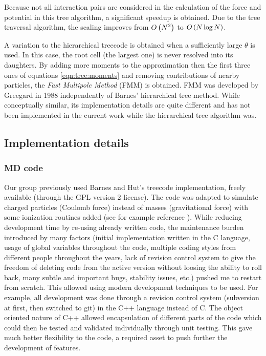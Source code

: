 Because not all interaction pairs are considered in the calculation of the
force and potential in this tree algorithm,
a significant speedup is obtained. Due to the tree
traversal algorithm, the scaling
improves
from $O\left( N^2 \right)$ to $O\left( N \log{N} \right)$\cite{Barnes1986,Gibbon2002,Pfalzner1996}.

A variation to the hierarchical treecode is obtained when a sufficiently large
$\theta$ is used. In this case, the root cell (the largest one) is never
resolved into its daughters. By adding more moments to the approximation then
the first three ones of equations \eqref{eqn:tree:moments} and removing
contributions of nearby particles, the \textit{Fast Multipole Method} (FMM) is
obtained\cite{Pfalzner1996}. FMM was developed by Greegard in
1988\cite{Greengard1987} independently of Barnes' hierarchical tree method.
While conceptually similar, its implementation details are quite different and
has not been implemented in the current work while the hierarchical tree
algorithm was.



\subsection{Implementation details}

\subsubsection{MD code}

Our group previously used Barnes and Hut's treecode implementation,
freely available\cite{treecode} (through the GPL version 2 license). The code was adapted
to simulate charged particles (Coulomb force) instead of masses (gravitational
force) with some ionization routines added (see for example reference
\cite{Jungreuthmayer2005}). While reducing development time by re-using already
written code, the maintenance burden introduced by many factors (initial
implementation written in the C language, usage of global variables
throughout the code, multiple coding styles from different people throughout
the years,
%
lack of revision control system to give the freedom
of deleting code from the active version without loosing the ability to roll
back, many subtle and important bugs, stability issues, etc.) pushed me
to restart from scratch. This allowed using modern development techniques to be
used. For example, all development was done through a revision control system
(subversion\cite{svn} at first, then switched to git\cite{git}) in the C++
language instead of C. The object oriented nature of C++ allowed encapsulation
of different parts of the code which could then be tested and validated
individually through unit testing. This gave much better flexibility to the
code, a required asset to
push further the development of features.

